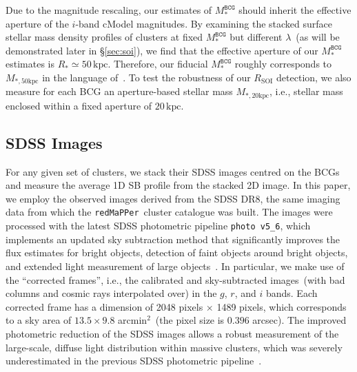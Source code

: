 \documentclass[fleqn,usenatbib]{mnras}
\newcommand{\rsoi}{R_{\mathrm{SOI}}}
\newcommand{\msbcg}{M_*^{\texttt{BCG}}}
\newcommand{\kpc}{\mathrm{kpc}}
\newcommand\redmapper{\texttt{redMaPPer}}
\begin{document}
Due to the magnitude rescaling, our estimates of $\msbcg$ should inherit
the effective aperture of the $i$-band cModel magnitudes. By examining the
stacked surface stellar mass density profiles of clusters at fixed $\msbcg$
but different $\lambda$~(as will be demonstrated later in \S\ref{sec:soi}),
we find that the effective aperture of our $\msbcg$ estimates is
$R_*{\simeq}50\,\kpc$.  Therefore, our fiducial $\msbcg$ roughly
corresponds to $M_{*,50\kpc}$ in the language of~\citet{Huang2021}.  To
test the robustness of our $\rsoi$ detection, we also measure for each BCG
an aperture-based stellar mass $M_{*,20\kpc}$, i.e., stellar mass enclosed
within a fixed aperture of $20\,\kpc$.


\subsection{SDSS Images}
\label{subsec:img}



For any given set of clusters, we stack their SDSS images centred on the
BCGs and measure the average 1D SB profile from the stacked 2D image. In
this paper, we employ the observed images derived from the SDSS DR8, the
same imaging data from which the \redmapper~cluster catalogue was built.
The images were processed with the latest SDSS photometric pipeline
\texttt{photo v5\_6}, which implements an updated sky subtraction method
that significantly improves the flux estimates for bright objects,
detection of faint objects around bright objects, and extended light
measurement of large objects~\citep{Blanton2011}.  In particular, we make
use of the ``corrected frames'', i.e., the calibrated and sky-subtracted
images~(with bad columns and cosmic rays interpolated over) in the $g$,
$r$, and $i$ bands.  Each corrected frame has a dimension of 2048 pixels
${\times}$ 1489 pixels, which corresponds to a sky area of
$13.5{\times}9.8$ arcmin$^{2}$~(the pixel size is $0.396$ arcsec). The
improved photometric reduction of the SDSS images allows a robust
measurement of the large-scale, diffuse light distribution within massive
clusters, which was severely underestimated in the previous SDSS
photometric pipeline~\citep{Bernardi2013, Kravtsov2018}.
\end{document}
